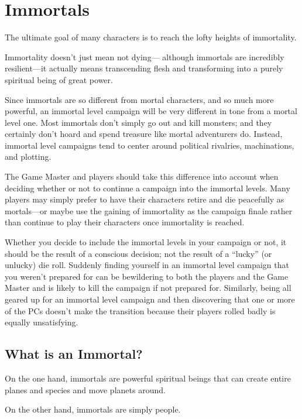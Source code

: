 \chapter[green]{Immortals}
\label{chap:Immortals}
\thispagestyle{plain}

\begin{multicols*}{2}
The ultimate goal of many characters is to reach the lofty heights of immortality.

Immortality doesn’t just mean not dying— although immortals are incredibly resilient—it actually means transcending flesh and transforming into a purely spiritual being of great power.

Since immortals are so different from mortal characters, and so much more powerful, an immortal level campaign will be very different in tone from a mortal level one. Most immortals don’t simply go out and kill monsters; and they certainly don’t hoard and spend treasure like mortal adventurers do. Instead, immortal level campaigns tend to center around political rivalries, machinations, and plotting.

The Game Master and players should take this difference into account when deciding whether or not to continue a campaign into the immortal levels. Many players may simply prefer to have their characters retire and die peacefully as mortals—or maybe use the gaining of immortality as the campaign finale rather than continue to play their characters once immortality is reached. 

Whether you decide to include the immortal levels in your campaign or not, it should be the result of a conscious decision; not the result of a “lucky” (or unlucky) die roll. Suddenly finding yourself in an immortal level campaign that you weren’t prepared for can be bewildering to both the players and the Game Master and is likely to kill the campaign if not prepared for. Similarly, being all geared up for an immortal level campaign and then discovering that one or more of the PCs doesn’t make the transition because their players rolled badly is equally unsatisfying.

\section{What is an Immortal?}
On the one hand, immortals are powerful spiritual beings that can create entire planes and species and move planets around.

On the other hand, immortals are simply people.


\end{multicols*}
